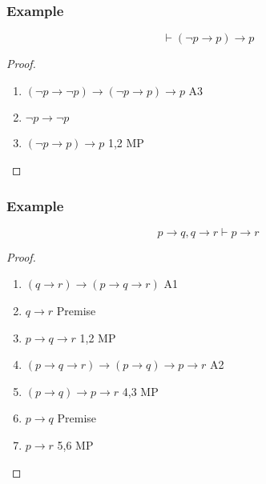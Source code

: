 \documentclass[UTF8,aspectratio=43,11pt,colorlinks,compress,openany]{beamer}%
\begin{document}
\begin{frame}\frametitle{Example}
	\begin{theorem}
		\[\vdash(\neg p\to p)\to p\]
	\end{theorem}
	\begin{proof}
		\begin{enumerate}
			\item $(\neg p \to\neg p) \to(\neg p \to p) \to p$ \hfill A3
			\item $\neg p \to \neg p$
			\item $(\neg p \to p) \to p$ \hfill 1,2 MP
		\end{enumerate}
	\end{proof}
\end{frame}

\begin{frame}\frametitle{Example}
	\begin{theorem}
		\[p\to q, q \to r\vdash p \to r\]
	\end{theorem}
	\begin{proof} 
		\begin{enumerate}
			\item $(q\to r)\to (p\to q\to r)$ \hfill A1
			\item $q \to r$ \hfill Premise
			\item $p \to q \to r$ \hfill 1,2 MP
			\item $(p \to q \to r) \to (p \to q) \to p \to r$ \hfill A2
			\item $(p \to q) \to p \to r$ \hfill 4,3 MP
			\item $p \to q$ \hfill Premise
			\item $p \to r$ \hfill 5,6 MP
		\end{enumerate}
	\end{proof}
\end{frame}
\end{document}

